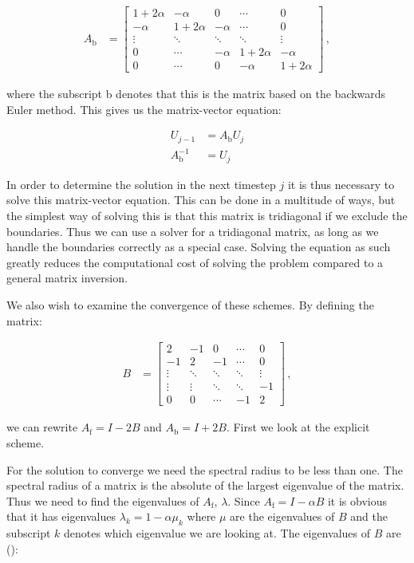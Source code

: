 \documentclass[reprint,english,notitlepage]{revtex4-1}  %
\begin{document}
\begin{align*}
A_\text{b} &= \begin{bmatrix}
1 + 2\alpha & -\alpha & 0   &\cdots & 0 \\
-\alpha & 1+2\alpha & -\alpha   & \cdots & 0 \\
\vdots & \ddots & \ddots & \ddots  & \vdots \\
0 & \cdots  & -\alpha & 1 + 2\alpha & -\alpha \\
0 & \cdots & 0 & -\alpha & 1 + 2\alpha 
\end{bmatrix} \, , 
\end{align*} 

where the subscript b denotes that this is the matrix based on the backwards Euler method. This gives us the matrix-vector equation:

\begin{align*}
U_{j-1} &= A_\text{b} U_j \\
A_\text{b}^{-1} &= U_j
\end{align*}


In order to determine the solution in the next timestep $j$ it is thus necessary to solve this matrix-vector equation. This can be done in a multitude of ways, but the simplest way of solving this is that this matrix is tridiagonal if we exclude the boundaries. Thus we can use a solver for a tridiagonal matrix, as long as we handle the boundaries correctly as a special case. Solving the equation as such greatly reduces the computational cost of solving the problem compared to a general matrix inversion.

We also wish to examine the convergence of these schemes. By defining the matrix:

\begin{align*}
B &= \begin{bmatrix}
2 & -1 & 0 & \cdots & 0 \\
-1 & 2 & -1 &  \cdots & 0 \\
\vdots & \ddots & \ddots & \ddots & \vdots \\
\vdots & \vdots & \ddots & \ddots & -1 \\
0 & 0 & \cdots & -1 & 2 
\end{bmatrix} \, ,
\end{align*}

we can rewrite $A_\text{f} = I - 2B$ and $A_\text{b} = I + 2B$. First we look at the explicit scheme.

For the solution to converge we need the spectral radius to be less than one. The spectral radius of a matrix is the absolute of the largest eigenvalue of the matrix. Thus we need to find the eigenvalues of $A_\text{f}$, $\lambda$. Since $A_\text{f} = I - \alpha B$ it is obvious that it has eigenvalues $\lambda_{k} = 1 - \alpha \mu_k$ where $\mu$ are the eigenvalues of $B$ and the subscript $k$ denotes which eigenvalue we are looking at. The eigenvalues of $B$ are (\cite[p.~307]{Hjorth-Jensen2015}):
\end{document}
